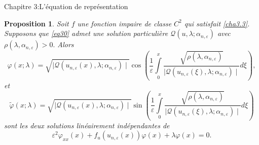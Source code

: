 \documentclass[mathserif,10pt]{beamer}
\newtheorem{proposition}{Proposition}
\begin{document}
\begin{frame}{Chapitre 3:L'équation de représentation}\transglitter[duration=1]
\begin{exampleblock}{}
\begin{proposition}\label{prop2.8}
Soit $f$ une fonction impaire de classe $C^{2}$ qui satisfait \eqref{cha3.3}. 
Supposons que \eqref{eq30} admet une solution particulière $\mathcal{Q}(u,\lambda ;\alpha_{n,\varepsilon} )$ 
avec $\rho (\lambda ,\alpha_{n,\varepsilon})> 0.$ Alors
$$
\varphi (x;\lambda )= \sqrt{\mid \mathcal{Q}(u_{n,\varepsilon }(x),\lambda ; \alpha_{n,\varepsilon })\mid  }\cos \left( \dfrac{1}{\varepsilon }\int\limits_{0}^{x}\dfrac{\sqrt{\rho (\lambda , \alpha_{n,\varepsilon })}}{\mid  \mathcal{Q}(u_{n,\varepsilon }(\xi ),\lambda ; \alpha_{n,\varepsilon })\mid }d\xi \right),
$$
et
$$
\tilde{\varphi}(x;\lambda )= \sqrt{\mid \mathcal{Q}(u_{n,\varepsilon }(x),\lambda ; \alpha_{n,\varepsilon })\mid  }\sin \left( \dfrac{1}{\varepsilon }\int\limits_{0}^{x}\dfrac{\sqrt{\rho (\lambda , \alpha_{n,\varepsilon })}}{\mid  \mathcal{Q}(u_{n,\varepsilon }(\xi ),\lambda ; \alpha_{n,\varepsilon })\mid }d\xi \right)
$$
sont les deux solutions linéairement indépendantes de
\begin{equation}\label{eq2.14}
\varepsilon^{2}\varphi_{xx}(x)+ f_{u}(u_{n,\varepsilon }(x))\varphi (x) + \lambda \varphi (x)= 0.
\end{equation}
\end{proposition}
\end{exampleblock}
\end{frame}
\end{document}
